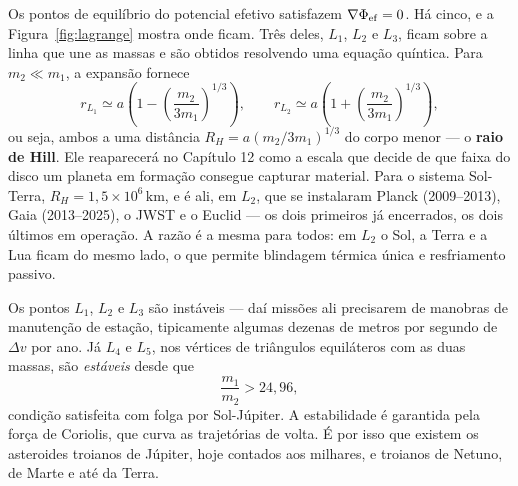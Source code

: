 \documentclass[11pt,a4paper]{article}
\begin{document}
Os pontos de equilíbrio do potencial efetivo satisfazem $\nabla\Phi_{\rm ef}=0$. Há cinco, e a Figura~\ref{fig:lagrange} mostra onde ficam. Três deles, $L_1$, $L_2$ e $L_3$, ficam sobre a linha que une as massas e são obtidos resolvendo uma equação quíntica. Para $m_2\ll m_1$, a expansão fornece
\[
r_{L_1}\simeq a\left(1-\left(\frac{m_2}{3m_1}\right)^{1/3}\right),
\qquad
r_{L_2}\simeq a\left(1+\left(\frac{m_2}{3m_1}\right)^{1/3}\right),
\]
ou seja, ambos a uma distância $R_H=a(m_2/3m_1)^{1/3}$ do corpo menor --- o \textbf{raio de Hill}. Ele reaparecerá no Capítulo 12 como a escala que decide de que faixa do disco um planeta em formação consegue capturar material. Para o sistema Sol-Terra, $R_H=1{,}5\times10^{6}\,\mathrm{km}$, e é ali, em $L_2$, que se instalaram Planck (2009--2013), Gaia (2013--2025), o JWST e o Euclid --- os dois primeiros já encerrados, os dois últimos em operação. A razão é a mesma para todos: em $L_2$ o Sol, a Terra e a Lua ficam do mesmo lado, o que permite blindagem térmica única e resfriamento passivo.

Os pontos $L_1$, $L_2$ e $L_3$ são instáveis --- daí missões ali precisarem de manobras de manutenção de estação, tipicamente algumas dezenas de metros por segundo de $\Delta v$ por ano. Já $L_4$ e $L_5$, nos vértices de triângulos equiláteros com as duas massas, são \emph{estáveis} desde que
\[
\frac{m_1}{m_2}>24{,}96,
\]
condição satisfeita com folga por Sol-Júpiter. A estabilidade é garantida pela força de Coriolis, que curva as trajetórias de volta. É por isso que existem os asteroides troianos de Júpiter, hoje contados aos milhares, e troianos de Netuno, de Marte e até da Terra.
\end{document}
